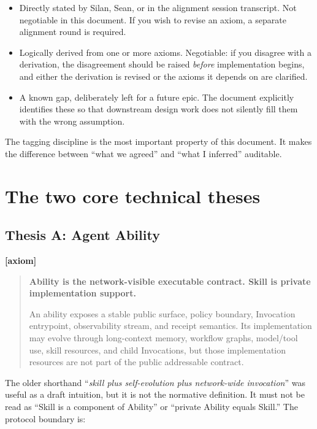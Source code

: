 \documentclass[11pt,a4paper]{article}
\newcommand{\axiom}{\textcolor{axiomcolor}{\textbf{[axiom]}}\xspace}
\newcommand{\derived}{\textcolor{derivedcolor}{\textbf{[derived]}}\xspace}
\newcommand{\deferred}{\textcolor{deferredcolor}{\textbf{[deferred]}}\xspace}
\begin{document}
\begin{itemize}[leftmargin=2.4em,itemsep=0.3em]
    \item[\axiom] Directly stated by Silan, Sean, or in the alignment session
    transcript. Not negotiable in this document. If you wish to revise an axiom,
    a separate alignment round is required.

    \item[\derived] Logically derived from one or more axioms. Negotiable: if
    you disagree with a derivation, the disagreement should be raised
    \emph{before} implementation begins, and either the derivation is revised
    or the axioms it depends on are clarified.

    \item[\deferred] A known gap, deliberately left for a future epic. The
    document explicitly identifies these so that downstream design work does
    not silently fill them with the wrong assumption.
\end{itemize}

The tagging discipline is the most important property of this document. It
makes the difference between ``what we agreed'' and ``what I inferred''
auditable.

\section{The two core technical theses}
\label{sec:two-theses}

\subsection{Thesis A: Agent Ability}

\axiom{}
\begin{quote}
\textbf{Ability is the network-visible executable contract. Skill is private
implementation support.}

\medskip
\noindent
An ability exposes a stable public surface, policy boundary, Invocation
entrypoint, observability stream, and receipt semantics. Its implementation
may evolve through long-context memory, workflow graphs, model/tool use, skill
resources, and child Invocations, but those implementation resources are not
part of the public addressable contract.
\end{quote}

The older shorthand
``\emph{skill plus self-evolution plus network-wide invocation}'' was useful
as a draft intuition, but it is not the normative definition. It must not be
read as ``Skill is a component of Ability'' or ``private Ability equals
Skill.'' The protocol boundary is:
\end{document}
